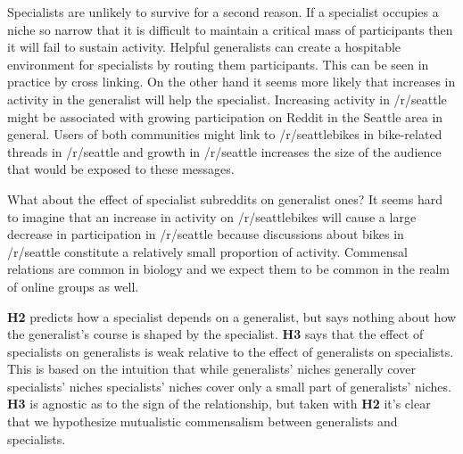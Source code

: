 \documentclass[12pt]{memoir}
\begin{document}

Specialists are unlikely to survive for a second reason. If a specialist occupies a niche so narrow that it is difficult to maintain a critical mass of participants then it will fail to sustain activity.  Helpful generalists can create a hospitable environment for specialists by routing them participants.  This can be seen in practice by cross linking. On the other hand it seems more likely that increases in activity in the generalist will help the specialist.  Increasing activity in /r/seattle might be associated with growing participation on Reddit in the Seattle area in general.  Users of both communities might link to /r/seattlebikes in bike-related threads in /r/seattle and growth in /r/seattle increases the size of the audience that would be exposed to these messages.



What about the effect of specialist subreddits on generalist ones?  It seems hard to imagine that an increase in activity on /r/seattlebikes will cause a large decrease in participation in /r/seattle because discussions about bikes in /r/seattle constitute a relatively small proportion of activity.  Commensal relations are common in biology and we expect them to be common in the realm of online groups as well.


\textbf{H2} predicts how a specialist depends on a generalist, but says nothing about how the generalist's course is shaped by the specialist.    \textbf{H3} says that the effect of specialists on generalists is weak relative to the effect of generalists on specialists.  This is based on the intuition that while generalists' niches generally cover specialists' niches specialists' niches cover only a small part of generalists' niches.  \textbf{H3} is agnostic as to the sign of the relationship, but taken with \textbf{H2} it's clear that we hypothesize mutualistic commensalism between generalists and specialists.


\end{document}
